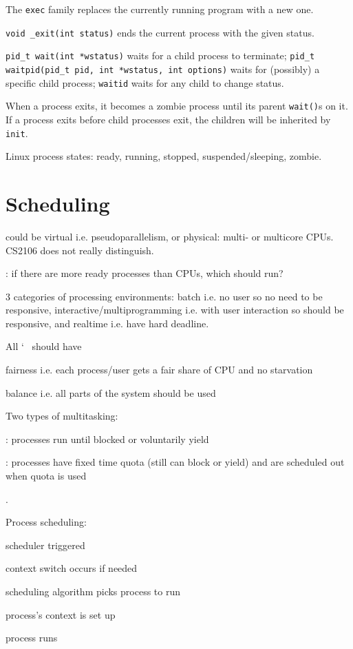 \documentclass[fontsize=9pt,twoside]{slnotes}
\newcommand\sltilde{\char`~}
\begin{document}
The \texttt{exec} family replaces the currently running program with a new one.

\texttt{void \_exit(int status)} ends the current process with the given status.

\texttt{pid\_t wait(int *wstatus)} waits for a child process to terminate; \texttt{pid\_t waitpid(pid\_t pid, int *wstatus, int options)} waits for (possibly) a specific child process; \texttt{waitid} waits for any child to change status.

When a process exits, it becomes a zombie process until its parent \texttt{wait()}s on it. If a process exits before child processes exit, the children will be inherited by \texttt{init}.

Linux process states: ready, running, stopped, suspended/sleeping, zombie.

\chapter{Scheduling}
 could be virtual i.e. pseudoparallelism, or physical: multi- or multicore CPUs. CS2106 does not really distinguish.

: if there are more ready processes than CPUs, which should run?

3 categories of processing environments: batch i.e. no user so no need to be responsive, interactive/multiprogramming i.e. with user interaction so should be responsive, and realtime i.e. have hard deadline.

All \sltilde{} should have \begin{slinenum}
\item fairness i.e. each process/user gets a fair share of CPU and no starvation
\item balance i.e. all parts of the system should be used
\end{slinenum}

Two types of multitasking: \begin{slinenum}
\item {}: processes run until blocked or voluntarily yield
\item {}: processes have fixed time quota (still can block or yield) and are scheduled out when quota is used
\end{slinenum}.

Process scheduling: \begin{slinenumthen}
\item scheduler triggered
\item context switch occurs if needed
\item scheduling algorithm picks process to run
\item process's context is set up
\item process runs
\end{slinenumthen}
\end{document}
